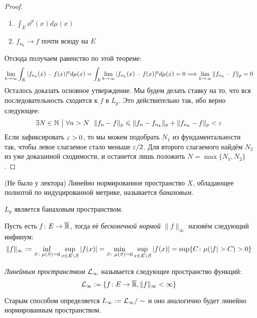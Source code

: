 \begin{proof}
\begin{enumerate}
		\item $\int_E \phi^p(x)d\mu(x)$
		
		\item $f_{n_k} \to f$ почти всюду на $E$
	\end{enumerate}
	Отсюда получаем равенство по этой теореме:
	\[
		\lim_{k \to \infty} \int_E |f_{n_k}(x) - f(x)|^pd\mu(x) = \int_E \lim_{k \to \infty} |f_{n_k}(x) - f(x)|^pd\mu(x) = 0 \Longrightarrow \lim_{k \to \infty} \|f_{n_k} - f\|_p = 0
	\]
	Осталось доказать основное утверждение. Мы будем делать ставку на то, что вся последовательность сходится к $f$ в $L_p$. Это действительно так, ибо верно следующее:
	\[
		\exists N \in \mathbb{N} \ \big|\  \forall n > N\ \ \|f_n - f\|_p \leqslant \|f_n - f_{n_k}\|_p + \|f_{n_k} - f\|_p < \varepsilon
	\]
	Если зафиксировать $\varepsilon > 0$, то мы можем подобрать $N_1$ из фундаментальности так, чтобы левое слагаемое стало меньше $\varepsilon / 2$. Для второго слагаемого найдём $N_2$ из уже доказанной сходимости, и останется лишь положить $N = \max\{N_1, N_2\}$.
\end{proof}

\begin{definition} (Не было у лектора)
	Линейно нормированное пространство $X$, обладающее полнотой по индуцированной метрике, называется \textit{банаховым}.
\end{definition}

\begin{corollary}
	$L_p$ является банаховым пространством.
\end{corollary}

\begin{definition}
	Пусть есть $f \colon E \to \overline{\mathbb{R}}$, тогда её \textit{бесконечной нормой} $\|f\|_\infty$ назовём следующий инфинум:
	\[
		\|f\|_\infty := \inf_{S \colon \mu(S) = 0} \sup_{x \in E \backslash S} |f(x)| = \min_{S \colon \mu(S) = 0} \sup_{x \in E \backslash S} |f(x)| = \sup \{C \colon \mu(|f| > C) > 0\}
	\]
\end{definition}

\begin{definition}
	\textit{Линейным пространством $\mathcal{L}_\infty$} называется следующее пространство функций:
	\[
		\mathcal{L}_\infty := \{f \colon E \to \overline{\mathbb{R}}, \|f\|_\infty < \infty\}
	\]
\end{definition}

\begin{note}
	Старым способом определяется $L_\infty := \mathcal{L}_\infty / \sim$ и оно аналогично будет линейно нормированным пространством.
\end{note}

